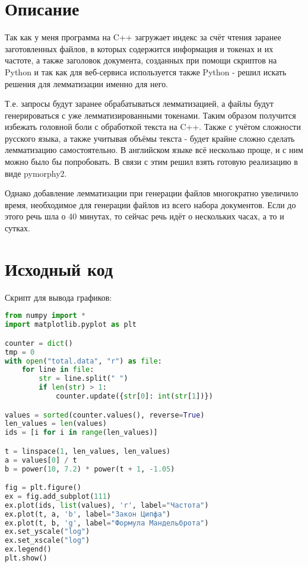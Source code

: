 \section{Описание}

Так как у меня программа на C++ загружает индекс за счёт чтения заранее заготовленных файлов, в которых содержится информация и токенах и их частоте, а также заголовок документа, созданных при помощи скриптов на Python и так как для веб-сервиса используется также Python - решил искать решения для лемматизации именно для него.

Т.е. запросы будут заранее обрабатываться лемматизацией, а файлы будут генерироваться с уже лемматизированными токенами. Таким образом получится избежать головной боли с обработкой текста на C++. Также с учётом сложности русского языка, а также учитывая объёмы текста - будет крайне сложно сделать лемматизацию самостоятельно. В английском языке всё несколько проще, и с ним можно было бы попробовать. В связи с этим решил взять готовую реализацию в виде pymorphy2.

Однако добавление лемматизации при генерации файлов многократно увеличило время, необходимое для генерации файлов из всего набора документов. Если до этого речь шла о 40 минутах, то сейчас речь идёт о нескольких часах, а то и сутках.

\lstset{extendedchars=\true}
\section{Исходный код}

Скрипт для вывода графиков:
\begin{lstlisting}[language=Python]
from numpy import *
import matplotlib.pyplot as plt

counter = dict()
tmp = 0
with open("total.data", "r") as file:
    for line in file:
        str = line.split(" ")
        if len(str) > 1:
            counter.update({str[0]: int(str[1])})

values = sorted(counter.values(), reverse=True)
len_values = len(values)
ids = [i for i in range(len_values)]

t = linspace(1, len_values, len_values)
a = values[0] / t
b = power(10, 7.2) * power(t + 1, -1.05)

fig = plt.figure()
ex = fig.add_subplot(111)
ex.plot(ids, list(values), 'r', label="Частота")
ex.plot(t, a, 'b', label="Закон Ципфа")
ex.plot(t, b, 'g', label="Формула Мандельброта")
ex.set_yscale("log")
ex.set_xscale("log")
ex.legend()
plt.show()
\end{lstlisting}